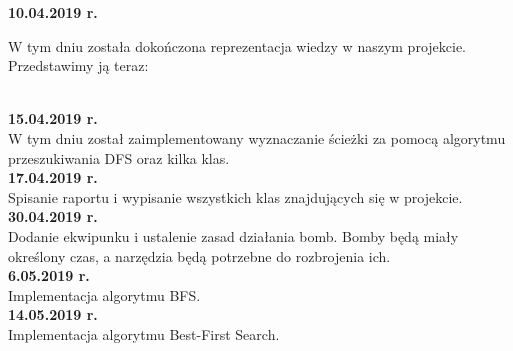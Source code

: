 \documentclass[12pt]{article}
\newcounter{coun}[section]
\begin{document}
\noindent\textbf{10.04.2019 r.}\\
\setcounter{coun}{0}

W tym dniu została dokończona reprezentacja wiedzy w naszym projekcie.
Przedstawimy ją teraz:

\\

\noindent\textbf{15.04.2019 r.}
\setcounter{coun}{0}\\

W tym dniu został zaimplementowany wyznaczanie ścieżki za pomocą algorytmu przeszukiwania DFS oraz kilka klas.\\

\noindent\textbf{17.04.2019 r.}
\setcounter{coun}{0}\\

Spisanie raportu i wypisanie wszystkich klas znajdujących się w projekcie.\\

\noindent\textbf{30.04.2019 r.}
\setcounter{coun}{0}\\

Dodanie ekwipunku i ustalenie zasad działania bomb. Bomby będą miały określony czas, a narzędzia będą potrzebne do rozbrojenia ich. \\

\noindent\textbf{6.05.2019 r.}
\setcounter{coun}{0}\\

Implementacja algorytmu BFS. \\ 

\noindent\textbf{14.05.2019 r.}
\setcounter{coun}{0}\\

Implementacja algorytmu Best-First Search. \\
\end{document}
